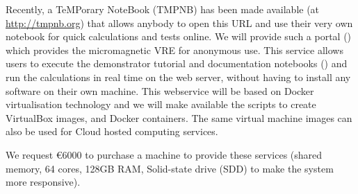 \begin{workpackage}
\begin{tasklist}
\begin{task}[lead=USO,title=Demonstrator: micromagnetic VRE notebooks,
  id=oommf-tutorial-and-documentation, PM=6, partners={SR,PS}]
\end{task}

\begin{task}[lead=USO,id=oommf-nb-ve,title=Online portal for
  micromagnetic VRE demonstrator,PM=3, partners={SR,JU}]

  Recently, a TeMPorary \Jupyter NoteBook (TMPNB) has been made
  available (at \href{http://tmpnb.org}{http://tmpnb.org}) that allows
  anybody to open this URL and use their very own \Jupyter notebook
  for quick calculations and tests online. We will provide such a
  portal () which provides the micromagnetic VRE for anonymous use. This
  service allows users to execute the demonstrator tutorial and
  documentation notebooks
  () and run the
  calculations in real time on the web server, without having to
  install any software on their own machine.  This webservice will be
  based on Docker \cite{Docker} virtualisation technology and we will
  make available the scripts to create VirtualBox \cite{Virtualbox}
  images, and Docker containers. The same virtual machine images can
  also be used for Cloud hosted computing services.

  We request \euro{6000} to purchase a machine to provide these
  services (shared memory, 64 cores, 128GB RAM, Solid-state drive (SDD)
  to make the system more responsive). 
\end{task}




\end{tasklist}
\end{workpackage}
